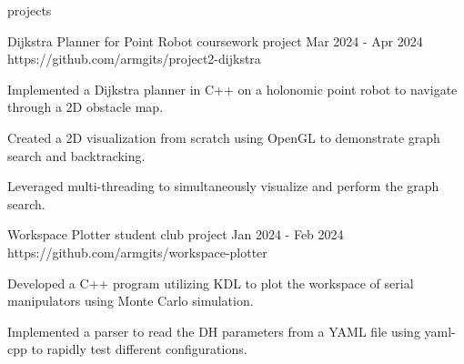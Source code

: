 \begin{section}{projects}

  \begin{project}
    {Dijkstra Planner for Point Robot}
    {coursework project}
    {Mar 2024 - Apr 2024}
    {https://github.com/armgits/project2-dijkstra}

    \item Implemented a Dijkstra planner in C++ on a holonomic point robot to navigate through a 2D
          obstacle map.

    \item Created a 2D visualization from scratch using OpenGL to demonstrate graph search and
          backtracking.

    \item Leveraged multi-threading to simultaneously visualize and perform the graph search.

   \end{project}






  \begin{project}
    {Workspace Plotter}
    {student club project}
    {Jan 2024 - Feb 2024}
    {https://github.com/armgits/workspace-plotter}

    \item Developed a C++ program utilizing KDL to plot the workspace of serial manipulators using
          Monte Carlo simulation.

    \item Implemented a parser to read the DH parameters from a YAML file using yaml-cpp to rapidly
          test different configurations.


\end{project}
\end{section}
